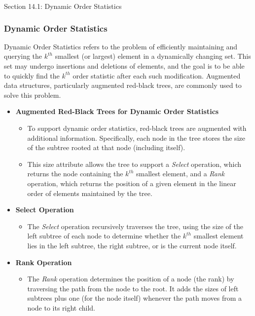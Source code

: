 \begin{notes}{Section 14.1: Dynamic Order Statistics}
    \subsubsection*{Dynamic Order Statistics}

    Dynamic Order Statistics refers to the problem of efficiently maintaining and querying the $k^{th}$ smallest (or largest) element in a dynamically changing set. This set may undergo insertions and 
    deletions of elements, and the goal is to be able to quickly find the $k^{th}$ order statistic after each such modification. Augmented data structures, particularly augmented red-black trees, are 
    commonly used to solve this problem.
    
    \begin{itemize}
        \item \textbf{Augmented Red-Black Trees for Dynamic Order Statistics}
        \begin{itemize}
            \item To support dynamic order statistics, red-black trees are augmented with additional information. Specifically, each node in the tree stores the size of the subtree rooted at that node 
            (including itself).
            \item This size attribute allows the tree to support a \textit{Select} operation, which returns the node containing the $k^{th}$ smallest element, and a \textit{Rank} operation, which returns 
            the position of a given element in the linear order of elements maintained by the tree.
        \end{itemize}
        
        \item \textbf{Select Operation}
        \begin{itemize}
            \item The \textit{Select} operation recursively traverses the tree, using the size of the left subtree of each node to determine whether the $k^{th}$ smallest element lies in the left subtree, 
            the right subtree, or is the current node itself.
        \end{itemize}
        
        \item \textbf{Rank Operation}
        \begin{itemize}
            \item The \textit{Rank} operation determines the position of a node (the rank) by traversing the path from the node to the root. It adds the sizes of left subtrees plus one (for the node 
            itself) whenever the path moves from a node to its right child.
        \end{itemize}
        

\end{itemize}
\end{notes}
